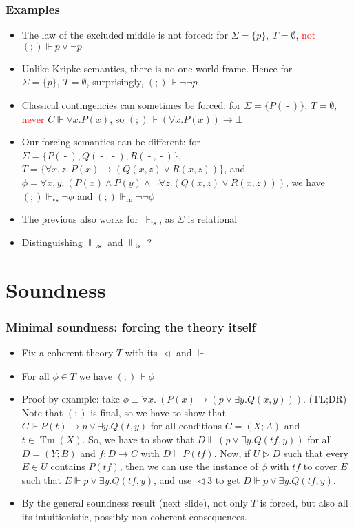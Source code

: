 \documentclass[handout,11pt]{beamer}
\newcommand{\red}[1]{\textcolor{red}{#1}}
\newcommand{\set}[1]{\{#1\}}
\newcommand{\es}{\emptyset}
\newcommand{\covd}{\mathrel{\vartriangleleft}}
\newcommand{\covs}{\mathrel{\vartriangleright}}
\newcommand*{\subvs}{_{\mathrm{vs}}}
\newcommand*{\subrn}{_{\mathrm{rn}}}
\newcommand*{\subts}{_{\mathrm{ts}}}
\newcommand{\Fts}{\Vdash\subts}
\newcommand{\Fvs}{\Vdash\subvs}
\newcommand{\Frn}{\Vdash\subrn}
\newcommand{\blank}{\mathord{\operatorname{-}}} %
\DeclareMathOperator{\Tm}{Tm}
\begin{document}
\begin{frame}
\frametitle{Examples}
 \begin{itemize}[<+->]
    \item The law of the excluded middle is not forced:
    for $\Sigma=\set{p},~T=\es$, \red{not} $(;)\Vdash p\lor\neg p$
    \item Unlike Kripke semantics, there is no one-world frame. Hence
    for $\Sigma=\set{p},~T=\es$, surprisingly, $(;)\Vdash \neg\neg p$
    \item Classical contingencies can sometimes be forced:
    for $\Sigma=\set{P(\blank)},~T=\es$, \red{never} $C\Vdash \forall x. P(x)$,
    so $(;)\Vdash (\forall x. P(x))\to\bot$
    \item Our forcing semantics can be different:
    for $\Sigma=\set{P(\blank),Q(\blank,\blank),R(\blank,\blank)}$, 
    $T=\set{\forall x,z.~P(x)\to(Q(x,z)\lor R(x,z))}$, and
    $\phi= \forall x,y.~(P(x)\land P(y)\land\neg\forall z.(Q(x,z)\lor R(x,z)))$,
    we have $(;)\Fvs \neg\phi$ and $(;)\Frn \neg\neg\phi$
    \item The previous also works for $\Fts$, as $\Sigma$ is relational
    \item Distinguishing $\Fvs$ and $\Fts$ ?
 \end{itemize}
\end{frame}

\section{Soundness}

\begin{frame}
\frametitle{Minimal soundness: forcing the theory itself}
\begin{itemize}[<+->]
 \item Fix a coherent theory $T$ with its $\covd$ and $\Vdash$    
 \item For all $\phi\in T$ we have $(;)\Vdash\phi$
 \item Proof by example: take
 $\phi\equiv\forall x.~(P(x)\to (p\lor \exists y. Q(x,y)))$.
 (TL;DR) Note that $(;)$ is final, so we have to show that 
 $C\Vdash P(t)\to p\lor \exists y. Q(t,y)$ for all
 conditions $C=(X;A)$ and $t\in\Tm(X)$. So, we have to show
 that $D\Vdash (p\lor \exists y. Q(tf,y))$ for all $D=(Y;B)$
 and $f:D\to C$ with $D\Vdash P(tf)$. Now, if $U\covs D$ such 
 that every $E\in U$ contains $P(tf)$, then we can use
 the instance of $\phi$ with $tf$ to cover $E$
 such that $E\Vdash p\lor \exists y. Q(tf,y)$,
 and use ${\covd}3$ to get $D\Vdash p\lor \exists y. Q(tf,y)$.
 \item By the general soundness result (next slide),
 not only $T$ is forced, but also all its intuitionistic,
 possibly non-coherent consequences.
 \end{itemize}
\end{frame}
\end{document}
